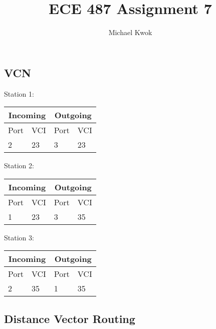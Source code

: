 \documentclass{article}
\title{ECE 487 Assignment 7}
\author{Michael Kwok}
\begin{document}
\maketitle
\subsection*{VCN}
Station 1:

\begin{center}
    \begin{tabular}{@{}llll@{}}
        \toprule
        \multicolumn{2}{c}{Incoming} & \multicolumn{2}{c}{Outgoing}              \\
        \midrule
        Port                         & VCI                          & Port & VCI \\
        2                            & 23                           & 3    & 23  \\
        \bottomrule
    \end{tabular}
\end{center}
Station 2:

\begin{center}
    \begin{tabular}{@{}llll@{}}
        \toprule
        \multicolumn{2}{c}{Incoming} & \multicolumn{2}{c}{Outgoing}              \\
        \midrule
        Port                         & VCI                          & Port & VCI \\
        1                            & 23                           & 3    & 35  \\
        \bottomrule
    \end{tabular}
\end{center}
Station 3:

\begin{center}
    \begin{tabular}{@{}llll@{}}
        \toprule
        \multicolumn{2}{c}{Incoming} & \multicolumn{2}{c}{Outgoing}              \\
        \midrule
        Port                         & VCI                          & Port & VCI \\
        2                            & 35                           & 1    & 35  \\
        \bottomrule
    \end{tabular}
\end{center}

\subsection*{Distance Vector Routing}
\end{document}
